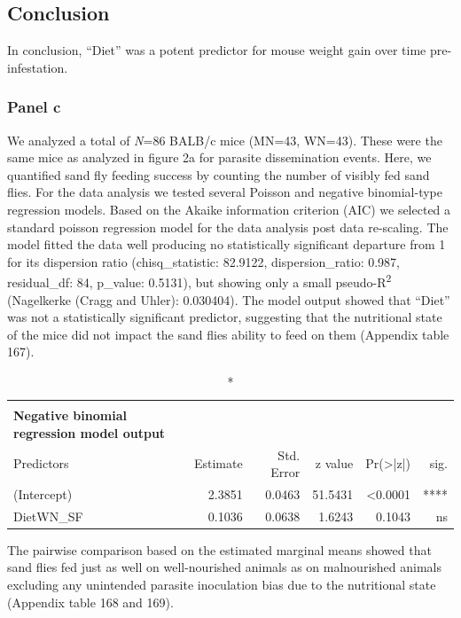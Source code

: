 \documentclass[
  12pt,
  letterpaper,
]{article}
\begin{document}
\subsection{Conclusion}\label{conclusion-3}

In conclusion, ``Diet'' was a potent predictor for mouse weight gain over time pre-infestation.

\subsubsection{Panel c}\label{panel-c-3}

We analyzed a total of \emph{N}=86 BALB/c mice (MN=43, WN=43). These were the same mice as analyzed in figure 2a for parasite dissemination events. Here, we quantified sand fly feeding success by counting the number of visibly fed sand flies. For the data analysis we tested several Poisson and negative binomial-type regression models. Based on the Akaike information criterion (AIC) we selected a standard poisson regression model for the data analysis post data re-scaling. The model fitted the data well producing no statistically significant departure from 1 for its dispersion ratio (chisq\_statistic: 82.9122, dispersion\_ratio: 0.987, residual\_df: 84, p\_value: 0.5131), but showing only a small pseudo-R\textsuperscript{2} (Nagelkerke (Cragg and Uhler): 0.030404). The model output showed that ``Diet'' was not a statistically significant predictor, suggesting that the nutritional state of the mice did not impact the sand flies ability to feed on them (Appendix table 167).

\begingroup
\fontsize{12.0pt}{14.4pt}\selectfont
\begin{longtable}{l|rrrrr}
\caption*{
{\large \textbf{Appendix Table 168}} \\ 
{\small \textbf{Negative binomial regression model output}}
} \\ 
\toprule
Predictors & {Estimate} & {Std. Error} & {z value} & {Pr(>|z|)} & {sig.} \\ 
\midrule\addlinespace[2.5pt]
(Intercept) & 2.3851 & 0.0463 & 51.5431 & <0.0001 & **** \\ 
DietWN\_SF & 0.1036 & 0.0638 & 1.6243 & 0.1043 & ns \\ 
\bottomrule
\end{longtable}
\endgroup

The pairwise comparison based on the estimated marginal means showed that sand flies fed just as well on well-nourished animals as on malnourished animals excluding any unintended parasite inoculation bias due to the nutritional state (Appendix table 168 and 169).
\end{document}
